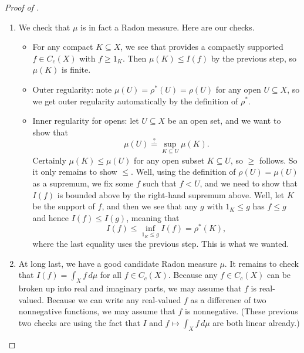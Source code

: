 \documentclass[../notes.tex]{subfiles}
\begin{document}
\begin{proof}[Proof of ]
\begin{enumerate}
		\item We check that $\mu$ is in fact a Radon measure. Here are our checks.
		\begin{itemize}
			\item For any compact $K\subseteq X$, we see that  provides a compactly supported $f\in C_c(X)$ with $f\ge1_K$. Then $\mu(K)\le I(f)$ by the previous step, so $\mu(K)$ is finite.
			\item Outer regularity: note $\mu(U)=\rho^*(U)=\rho(U)$ for any open $U\subseteq X$, so we get outer regularity automatically by the definition of $\rho^*$.
			\item Inner regularity for opens: let $U\subseteq X$ be an open set, and we want to show that
			\[\mu(U)\stackrel?=\sup_{K\subseteq U}\mu(K).\]
			Certainly $\mu(K)\le\mu(U)$ for any open subset $K\subseteq U$, so $\ge$ follows. So it only remains to show $\le$. Well, using the definition of $\rho(U)=\mu(U)$ as a supremum, we fix some $f$ such that $f<U$, and we need to show that $I(f)$ is bounded above by the right-hand supremum above. Well, let $K$ be the support of $f$, and then we see that any $g$ with $1_K\le g$ has $f\le g$ and hence $I(f)\le I(g)$, meaning that
			\[I(f)\le\inf_{1_K\le g}I(f)=\rho^*(K),\]
			where the last equality uses the previous step. This is what we wanted.
		\end{itemize}

		\item At long last, we have a good candidate Radon measure $\mu$. It remains to check that $I(f)=\int_Xf\,d\mu$ for all $f\in C_c(X)$. Because any $f\in C_c(X)$ can be broken up into real and imaginary parts, we may assume that $f$ is real-valued. Because we can write any real-valued $f$ as a difference of two nonnegative functions, we may assume that $f$ is nonnegative. (These previous two checks are using the fact that $I$ and $f\mapsto\int_Xf\,d\mu$ are both linear already.)
		

\end{enumerate}
\end{proof}
\end{document}
